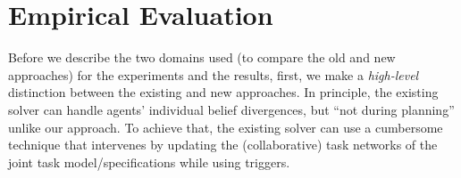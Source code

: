 \documentclass[letterpaper]{article} %
\begin{document}











\section{Empirical Evaluation}

Before we describe the two domains used (to compare the old and new approaches) for the experiments and the results, first, we make a \textit{high-level} distinction between the existing and new approaches. 
In principle, the existing solver can handle agents' individual belief divergences, but ``not during planning'' unlike our approach. To achieve that, the existing solver can use a cumbersome technique that intervenes by updating the (collaborative) task networks of the joint task model/specifications while using triggers.
\end{document}
